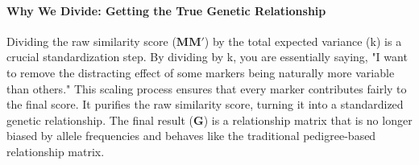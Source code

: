 \documentclass[12pt]{article}
\begin{document}
\paragraph{Why We Divide: Getting the True Genetic Relationship}
Dividing the raw similarity score ($\mathbf{MM'}$) by the total expected variance (k) is a crucial standardization step. By dividing by k, you are essentially saying, "I want to remove the distracting effect of some markers being naturally more variable than others." This scaling process ensures that every marker contributes fairly to the final score. It purifies the raw similarity score, turning it into a standardized genetic relationship. The final result ($\mathbf{G}$) is a relationship matrix that is no longer biased by allele frequencies and behaves like the traditional pedigree-based relationship matrix.
\end{document}
